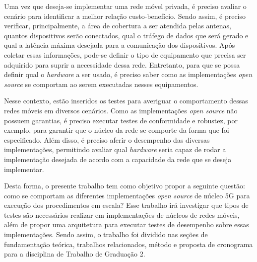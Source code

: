 Uma vez que deseja-se implementar uma rede móvel privada, é preciso avaliar o cenário para identificar a melhor relação custo-benefício.
Sendo assim, é preciso verificar, principalmente, a área de cobertura a ser atendida pelas antenas, quantos dispositivos serão conectados, qual o tráfego de dados que será gerado e qual a latência máxima desejada para a comunicação dos dispositivos.
Após coletar essas informações, pode-se definir o tipo de equipamento que precisa ser adquirido para suprir a necessidade dessa rede.
Entretanto, para que se possa definir qual o \textit{hardware} a ser usado, é preciso saber como as implementações \textit{open source} se comportam ao serem executadas nesses equipamentos.

Nesse contexto, estão inseridos os testes para averiguar o comportamento dessas redes móveis em diversos cenários.
Como as implementações \textit{open source} não possuem garantias, é preciso executar testes de conformidade e robustez, por exemplo, para garantir que o núcleo da rede se comporte da forma que foi especificado.
Além disso, é preciso aferir o desempenho das diversas implementações, permitindo avaliar qual \textit{hardware} seria capaz de rodar a implementação desejada de acordo com a capacidade da rede que se deseja implementar.

Desta forma, o presente trabalho tem como objetivo propor a seguinte questão: como se comportam as diferentes implementações \textit{open source} de núcleo 5G para execução dos procedimentos em escala?
Esse trabalho irá investigar que tipos de testes são necessários realizar em implementações de núcleos de redes móveis, além de propor uma arquitetura para executar testes de desempenho sobre essas implementações.
Sendo assim, o trabalho foi dividido nas seções de fundamentação teórica, trabalhos relacionados, método e proposta de cronograma para a disciplina de Trabalho de Graduação 2.
